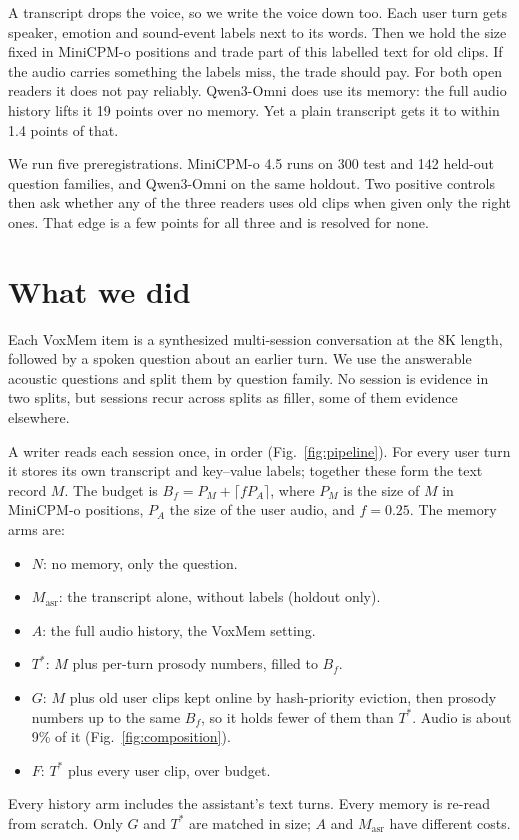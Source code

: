 \documentclass[11pt]{article}
\begin{document}
A transcript drops the voice, so we write the voice down too. Each user turn gets speaker, emotion and
sound-event labels next to its words. Then we hold the size fixed in MiniCPM-o positions and trade part of this labelled
text for old clips. If the audio carries something the labels miss, the trade should pay. For both open
readers it does not pay reliably. Qwen3-Omni does use its memory: the full audio history lifts it 19 points
over no memory. Yet a plain transcript gets it to within 1.4 points of that.

We run five preregistrations. MiniCPM-o 4.5 runs on 300 test and 142 held-out question families, and
Qwen3-Omni on the same holdout. Two positive controls then ask whether any of the three readers uses
old clips when given only the right ones. That edge is a few points for all three and is resolved for none.

\section{What we did}

Each VoxMem item is a synthesized multi-session conversation at the 8K length, followed by a spoken question
about an earlier turn. We use the answerable acoustic questions and split them by question family. No session is
evidence in two splits, but sessions recur across splits as filler, some of them evidence elsewhere.

\begin{samepage}
A writer reads each session once, in order (Fig.~\ref{fig:pipeline}). For every user turn it stores its own
transcript and key--value labels; together these form the text record $M$. The budget is
$B_f = P_M + \lceil f P_A \rceil$, where $P_M$ is the size of $M$ in MiniCPM-o positions, $P_A$ the size of
the user audio, and $f = 0.25$. The memory arms are:
\par\end{samepage}
\begin{itemize}
\item $N$: no memory, only the question.
\item $M_{\mathrm{asr}}$: the transcript alone, without labels (holdout only).
\item $A$: the full audio history, the VoxMem setting.
\item $T^*$: $M$ plus per-turn prosody numbers, filled to $B_f$.
\item $G$: $M$ plus old user clips kept online by hash-priority eviction, then prosody numbers up to the same
  $B_f$, so it holds fewer of them than $T^*$. Audio is about 9\% of it (Fig.~\ref{fig:composition}).
\item $F$: $T^*$ plus every user clip, over budget.
\end{itemize}
Every history arm includes the assistant's text turns. Every memory is re-read from scratch. Only $G$ and $T^*$ are matched in size;
$A$ and $M_{\mathrm{asr}}$ have different costs.
\end{document}
